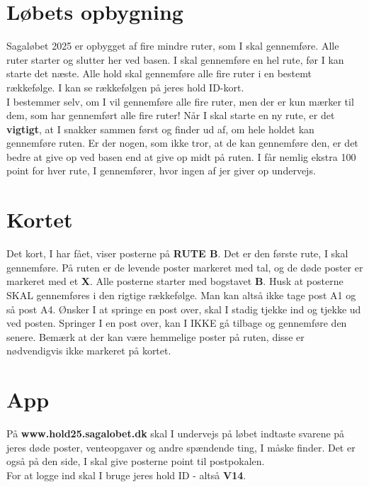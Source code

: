 \section{Løbets opbygning}
Sagaløbet 2025 er opbygget af fire mindre ruter, som I skal gennemføre. Alle ruter starter og slutter her ved basen. I skal gennemføre en hel rute, før I kan starte det næste. Alle hold skal gennemføre alle fire ruter i en bestemt rækkefølge. I kan se rækkefølgen på jeres hold ID-kort.\\\newline
I bestemmer selv, om I vil gennemføre alle fire ruter, men der er kun mærker til dem, som har gennemført alle fire ruter! Når I skal starte en ny rute, er det \textbf{vigtigt}, at I snakker sammen først og finder ud af, om hele holdet kan gennemføre ruten. Er der nogen, som ikke tror, at de kan gennemføre den, er det bedre at give op ved basen end at give op midt på ruten. I får nemlig ekstra 100 point for hver rute, I gennemfører, hvor ingen af jer giver op undervejs.\\
\section{Kortet}
Det kort, I har fået, viser posterne på \textbf{RUTE B}. Det er den første rute, I skal gennemføre. På ruten er de levende poster markeret med tal, og de døde poster er markeret med et \textbf{X}. Alle posterne starter med bogstavet \textbf{B}. Husk at posterne SKAL gennemføres i den rigtige rækkefølge. Man kan altså ikke tage post A1 og så post A4. Ønsker I at springe en post over, skal I stadig tjekke ind og tjekke ud ved posten. Springer I en post over, kan I IKKE gå tilbage og gennemføre den senere. Bemærk at der kan være hemmelige poster på ruten, disse er nødvendigvis ikke markeret på kortet.
\section{App}
På \textbf{www.hold25.sagalobet.dk} skal I undervejs på løbet indtaste svarene på jeres døde poster, venteopgaver og andre spændende ting, I måske finder. Det er også på den side, I skal give posterne point til postpokalen.\\
For at logge ind skal I bruge jeres hold ID - altså \textbf{V14}.
\newpage
